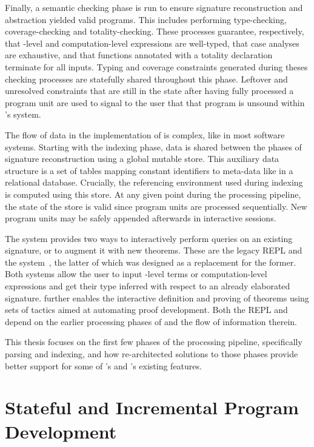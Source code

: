 Finally, a semantic checking phase is run to ensure signature reconstruction and abstraction yielded valid programs.
This includes performing type-checking, coverage-checking and totality-checking.
These processes guarantee, respectively, that \LF-level and computation-level expressions are well-typed, that case analyses are exhaustive, and that functions annotated with a totality declaration terminate for all inputs.
Typing and coverage constraints generated during theses checking processes are statefully shared throughout this phase.
Leftover and unresolved constraints that are still in the state after having fully processed a program unit are used to signal to the user that that program is unsound within \Beluga's system.

The flow of data in the implementation of \Beluga is complex, like in most software systems.
Starting with the indexing phase, data is shared between the phases of signature reconstruction using a global mutable store.
This auxiliary data structure is a set of tables mapping constant identifiers to meta-data like in a relational database.
Crucially, the referencing environment used during indexing is computed using this store.
At any given point during the processing pipeline, the state of the store is valid since program units are processed sequentially.
New program units may be safely appended afterwards in interactive sessions.

The \Beluga system provides two ways to interactively perform queries on an existing \Beluga signature, or to augment it with new theorems.
These are the legacy \ac{REPL} and the \Harpoon system~\cite{errington2021harpoon}, the latter of which was designed as a replacement for the former.
Both systems allow the user to input \LF-level terms or computation-level expressions and get their type inferred with respect to an already elaborated \Beluga signature.
\Harpoon further enables the interactive definition and proving of theorems using sets of tactics aimed at automating proof development.
Both the \ac{REPL} and \Harpoon depend on the earlier processing phases of \Beluga and the flow of information therein.

This thesis focuses on the first few phases of the \Beluga processing pipeline, specifically parsing and indexing, and how re-architected solutions to those phases provide better support for some of \Beluga's and \Harpoon's existing features.

\section{Stateful and Incremental Program Development}

